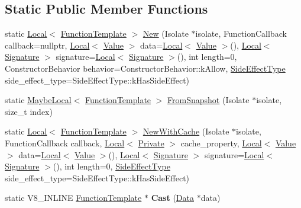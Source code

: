 \subsection*{Static Public Member Functions}
\begin{DoxyCompactItemize}
\item 
static \mbox{\hyperlink{classv8_1_1Local}{Local}}$<$ \mbox{\hyperlink{classv8_1_1FunctionTemplate}{Function\+Template}} $>$ \mbox{\hyperlink{classv8_1_1FunctionTemplate_a3b675b8327f08a7c6a4c4d9dce5cb3b3}{New}} (Isolate $\ast$isolate, Function\+Callback callback=nullptr, \mbox{\hyperlink{classv8_1_1Local}{Local}}$<$ \mbox{\hyperlink{classv8_1_1Value}{Value}} $>$ data=\mbox{\hyperlink{classv8_1_1Local}{Local}}$<$ \mbox{\hyperlink{classv8_1_1Value}{Value}} $>$(), \mbox{\hyperlink{classv8_1_1Local}{Local}}$<$ \mbox{\hyperlink{classv8_1_1Signature}{Signature}} $>$ signature=\mbox{\hyperlink{classv8_1_1Local}{Local}}$<$ \mbox{\hyperlink{classv8_1_1Signature}{Signature}} $>$(), int length=0, Constructor\+Behavior behavior=Constructor\+Behavior\+::k\+Allow, \mbox{\hyperlink{namespacev8_a29711319c2b9fc7716d65faee2f7b9cb}{Side\+Effect\+Type}} side\+\_\+effect\+\_\+type=Side\+Effect\+Type\+::k\+Has\+Side\+Effect)
\item 
static \mbox{\hyperlink{classv8_1_1MaybeLocal}{Maybe\+Local}}$<$ \mbox{\hyperlink{classv8_1_1FunctionTemplate}{Function\+Template}} $>$ \mbox{\hyperlink{classv8_1_1FunctionTemplate_acd9eaca4c7d6de89949b8e1c41f4ba46}{From\+Snapshot}} (Isolate $\ast$isolate, size\+\_\+t index)
\item 
static \mbox{\hyperlink{classv8_1_1Local}{Local}}$<$ \mbox{\hyperlink{classv8_1_1FunctionTemplate}{Function\+Template}} $>$ \mbox{\hyperlink{classv8_1_1FunctionTemplate_a0718db9d9b5ca6e37899ec15b208c0ba}{New\+With\+Cache}} (Isolate $\ast$isolate, Function\+Callback callback, \mbox{\hyperlink{classv8_1_1Local}{Local}}$<$ \mbox{\hyperlink{classv8_1_1Private}{Private}} $>$ cache\+\_\+property, \mbox{\hyperlink{classv8_1_1Local}{Local}}$<$ \mbox{\hyperlink{classv8_1_1Value}{Value}} $>$ data=\mbox{\hyperlink{classv8_1_1Local}{Local}}$<$ \mbox{\hyperlink{classv8_1_1Value}{Value}} $>$(), \mbox{\hyperlink{classv8_1_1Local}{Local}}$<$ \mbox{\hyperlink{classv8_1_1Signature}{Signature}} $>$ signature=\mbox{\hyperlink{classv8_1_1Local}{Local}}$<$ \mbox{\hyperlink{classv8_1_1Signature}{Signature}} $>$(), int length=0, \mbox{\hyperlink{namespacev8_a29711319c2b9fc7716d65faee2f7b9cb}{Side\+Effect\+Type}} side\+\_\+effect\+\_\+type=Side\+Effect\+Type\+::k\+Has\+Side\+Effect)
\item 
\mbox{\label{classv8_1_1FunctionTemplate_abd44ba8482fceb30ffa3d2f8863fac1e}} 
static V8\+\_\+\+I\+N\+L\+I\+NE \mbox{\hyperlink{classv8_1_1FunctionTemplate}{Function\+Template}} $\ast$ {\bfseries Cast} (\mbox{\hyperlink{classv8_1_1Data}{Data}} $\ast$data)
\end{DoxyCompactItemize}
